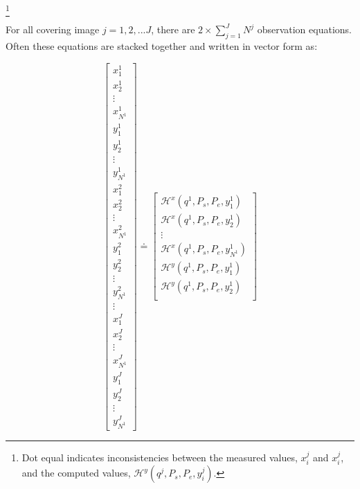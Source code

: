 \footnote{Dot equal indicates inconsistencies between the measured values, $x^j_i$ and $x^j_i$, and the computed values, $\mathcal{H}^y(q^j,P_s,P_e,y^j_i)$.}


For all covering image $j=1,2,...J$, there are $2\times\displaystyle\sum_{j=1}^{J}N^j$ observation equations. Often these equations are stacked together and written in vector form as:

\begin{equation} \label{eq:obs-camera1}
\begin{bmatrix}
 x^1_{1}\\[0.3em]
 x^1_{2}\\[0.3em]
 \vdots\\[0.3em]
 x^1_{N^1}\\[0.5em]
 y^1_{1}\\[0.3em]
 y^1_{2}\\[0.3em]
 \vdots\\[0.3em]
 y^1_{N^1}\\[0.8em]
 x^2_{1}\\[0.3em]
 x^2_{2}\\[0.3em]
 \vdots\\[0.3em]
 x^2_{N^1}\\[0.5em]
 y^2_{1}\\[0.3em]
 y^2_{2}\\[0.3em]
 \vdots\\[0.3em]
 y^2_{N^1}\\[0.8em]
 \vdots\\[0.3em]
 x^J_{1}\\[0.3em]
 x^J_{2}\\[0.3em]
 \vdots\\[0.3em]
 x^J_{N^1}\\[0.5em]
 y^J_{1}\\[0.3em]
 y^J_{2}\\[0.3em]
 \vdots\\[0.3em]
 y^J_{N^1}
\end{bmatrix}
\doteq %
\begin{bmatrix}
 \mathcal{H}^x(q^1,P_s,P_e,y^1_{1})\\[0.3em]
 \mathcal{H}^x(q^1,P_s,P_e,y^1_{2})\\[0.3em]
 \vdots\\[0.3em]
 \mathcal{H}^x(q^1,P_s,P_e,y^1_{N^1})\\[0.5em]
 \mathcal{H}^y(q^1,P_s,P_e,y^1_{1})\\[0.3em]
 \mathcal{H}^y(q^1,P_s,P_e,y^1_{2})\\[0.3em]

\end{bmatrix}
\end{equation}
